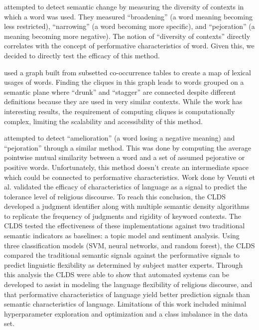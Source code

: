 \documentclass[11pt]{article}
\begin{document}
 attempted to detect semantic change by measuring the diversity of contexts in which a word was used. They measured “broadening” (a word meaning becoming less restricted), “narrowing” (a word becoming more specific), and “pejoration” (a meaning becoming more negative). The notion of “diversity of contexts” directly correlates with the concept of performative characteristics of word. Given this, we decided to directly test the efficacy of this method. 

 used a graph built from subsetted co-occurrence tables to create a map of lexical usages of words. Finding the cliques in this graph leads to words grouped on a semantic plane where “drunk” and “stagger” are connected despite different definitions because they are used in very similar contexts. While the work has interesting results, the requirement of computing cliques is computationally complex, limiting the scalability and accessibility of this method.

\cite{Cook2010} attempted to detect “amelioration” (a word losing a negative meaning) and “pejoration” through a similar method. This was done by computing the average pointwise mutual similarity between a word and a set of assumed pejorative or positive words. Unfortunately, this method doesn’t create an intermediate space which could be connected to performative characteristics.
Work done by Venuti et al. validated the efficacy of characteristics of language as a signal to predict the tolerance level of religious discourse. To reach this conclusion, the CLDS developed a judgment identifier along with multiple semantic density algorithms to replicate the frequency of judgments and rigidity of keyword contexts. The CLDS tested the effectiveness of these implementations against two traditional semantic indicators as baselines: a topic model and sentiment analysis. Using three classification models (SVM, neural networks, and random forest), the CLDS compared the traditional semantic signals against the performative signals to predict linguistic flexibility as determined by subject matter experts. Through this analysis the CLDS were able to show that automated systems can be developed to assist in modeling the language flexibility of religious discourse, and that performative characteristics of language yield better prediction signals than semantic characteristics of language. Limitations of this work included minimal hyperparameter exploration and optimization and a class imbalance in the data set. 
\end{document}
